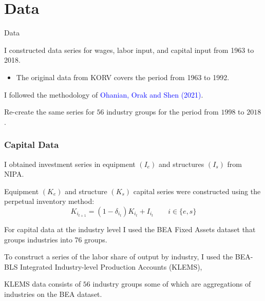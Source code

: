 \documentclass[notes,11pt, aspectratio=169]{beamer}
\newenvironment{wideitemize}{\itemize\addtolength{\itemsep}{10pt}}{\enditemize}
\begin{document}

\section*{Data}
\begin{frame}{Data}
 \begin{wideitemize}
 \item I constructed data series for wages, labor input, and capital input from 1963 to 2018.
 \begin{itemize}
 \item The original data from KORV covers the period from 1963 to 1992.
 \end{itemize}
 \item I followed the methodology of \textcolor{blue}{Ohanian, Orak and Shen (2021)}. 
 \item Re-create the same series for $56$ industry groups for the period from $1998$ to $2018$.
 \end{wideitemize}
 \end{frame}
 
\begin{frame}
\frametitle{Capital Data}
\begin{wideitemize}
 \item I obtained investment series in equipment $(I_e)$ and structures $(I_s)$ from NIPA.
 \item Equipment $(K_e)$ and structure $(K_s)$ capital series were constructed using the perpetual inventory method:
 \begin{equation*}\label{eq:capital_law_motion}
 K_{i_{t+1}} = (1 - \delta_{i_t}) K_{i_{t}} + I_{i_{t}} \qquad i\in\{e, s\}
 \end{equation*}
 \item For capital data at the industry level I used the BEA Fixed Assets dataset that groups industries into 76 groups. 
 \item To construct a series of the labor share of output by industry, I used the BEA-BLS Integrated Industry-level Production Accounts (KLEMS), 
 \item KLEMS data consists of $56$ industry groups some of which are aggregations of industries on the BEA dataset.
\end{wideitemize}
\end{frame}
\end{document}
